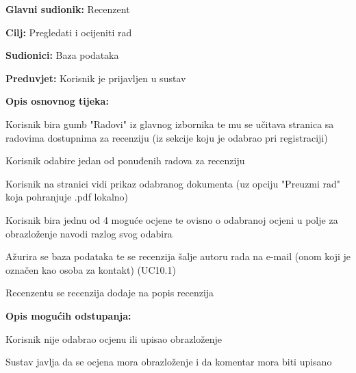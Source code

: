 				
					\noindent {}
					\begin{packed_item}
						
						\item \textbf{Glavni sudionik:} Recenzent
						\item \textbf{Cilj:} Pregledati i ocijeniti rad
						\item \textbf{Sudionici:} Baza podataka
						\item \textbf{Preduvjet:} Korisnik je prijavljen u sustav
						\item \textbf{Opis osnovnog tijeka:} 
						
						\item[] \begin{packed_enum}
							
							\item Korisnik bira gumb "Radovi" iz glavnog izbornika te mu se učitava stranica sa radovima dostupnima za recenziju (iz sekcije koju je odabrao pri registraciji)
							\item Korisnik odabire jedan od ponuđenih radova za recenziju
							\item  Korisnik na stranici vidi prikaz odabranog dokumenta (uz opciju "Preuzmi rad" koja pohranjuje .pdf lokalno)
							\item Korisnik bira jednu od 4 moguće ocjene te ovisno o odabranoj ocjeni u polje za obrazloženje navodi razlog svog odabira
							\item Ažurira se baza podataka te se recenzija šalje autoru rada na e-mail  (onom koji je označen kao osoba za kontakt) (UC10.1)
							\item Recenzentu se recenzija dodaje na popis recenzija
							
							
						\end{packed_enum}
						
						\item \textbf{Opis mogućih odstupanja:}
						
						\item[] \begin{packed_enum}
							\item[4.a] Korisnik nije odabrao ocjenu ili upisao obrazloženje
							\item[] \begin{packed_enum}
								\item[1.] Sustav javlja da se ocjena mora obrazloženje i da komentar mora biti upisano
							\end{packed_enum}
							

\end{packed_enum}
\end{packed_item}
